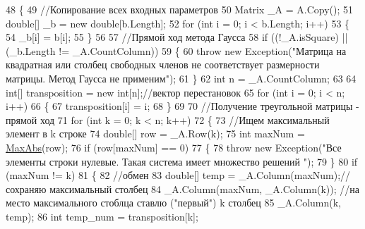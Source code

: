 \begin{DoxyCode}
48         \{
49             \textcolor{comment}{//Копирование всех входных параметров}
50             Matrix \_A = A.Copy();
51             \textcolor{keywordtype}{double}[] \_b = \textcolor{keyword}{new} \textcolor{keywordtype}{double}[b.Length];
52             \textcolor{keywordflow}{for} (\textcolor{keywordtype}{int} i = 0; i < b.Length; i++)
53             \{
54                 \_b[i] = b[i];
55             \}
56 
57             \textcolor{comment}{//Прямой ход метода Гаусса}
58             \textcolor{keywordflow}{if} ((!\_A.isSquare) || (\_b.Length != \_A.CountColumn))
59             \{
60                 \textcolor{keywordflow}{throw} \textcolor{keyword}{new} Exception(\textcolor{stringliteral}{"Матрица на квадратная или столбец свободных членов не соответствует
       размерности матрицы. Метод Гаусса не применим"});
61             \}
62             \textcolor{keywordtype}{int} n = \_A.CountColumn;
63 
64             \textcolor{keywordtype}{int}[] transposition = \textcolor{keyword}{new} \textcolor{keywordtype}{int}[n];\textcolor{comment}{//вектор перестановок}
65             \textcolor{keywordflow}{for} (\textcolor{keywordtype}{int} i = 0; i < n; i++)
66             \{
67                 transposition[i] = i;
68             \}
69 
70             \textcolor{comment}{//Получение треугольной матрицы - прямой ход }
71             \textcolor{keywordflow}{for} (\textcolor{keywordtype}{int} k = 0; k < n; k++)
72             \{
73                 \textcolor{comment}{//Ищем максимальный элемент в k строке}
74                 \textcolor{keywordtype}{double}[] row = \_A.Row(k);
75                 \textcolor{keywordtype}{int} maxNum = \hyperlink{class_b_l_a_s_1_1_computation_a6b1d14ddde137052891ae426962a495d}{MaxAbs}(row);
76                 \textcolor{keywordflow}{if} (row[maxNum] == 0)
77                 \{
78                     \textcolor{keywordflow}{throw} \textcolor{keyword}{new} Exception(\textcolor{stringliteral}{"Все элементы строки нулевые. Такая система имеет множество решений
      "});
79                 \}
80                 \textcolor{keywordflow}{if} (maxNum != k)
81                 \{
82                     \textcolor{comment}{//обмен}
83                     \textcolor{keywordtype}{double}[] temp = \_A.Column(maxNum);\textcolor{comment}{//сохраняю максимальный столбец }
84                     \_A.Column(maxNum, \_A.Column(k)); \textcolor{comment}{//на место максимального стоблца ставлю ("первый") k
       столбец}
85                     \_A.Column(k, temp);
86                     \textcolor{keywordtype}{int} temp\_num = transposition[k];

\end{DoxyCode}
